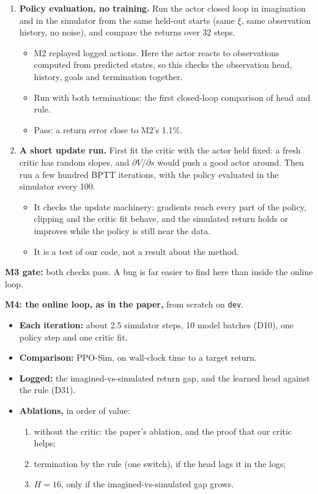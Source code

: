 \documentclass[10pt]{article}
\begin{document}
\begin{enumerate}
  \item \textbf{Policy evaluation, no training.} Run the actor closed loop in imagination and in the
  simulator from the same held-out starts (same $\xi$, same observation history, no noise), and compare
  the returns over 32 steps.
  \begin{itemize}
    \item M2 replayed logged actions. Here the actor reacts to observations computed from predicted
    states, so this checks the observation head, history, goals and termination together.
    \item Run with both terminations: the first closed-loop comparison of head and rule.
    \item Pass: a return error close to M2's 1.1\%.
  \end{itemize}
  \item \textbf{A short update run.} First fit the critic with the actor held fixed: a fresh critic
  has random slopes, and $\partial V/\partial s$ would push a good actor around. Then run a few hundred
  BPTT iterations, with the policy evaluated in the simulator every 100.
  \begin{itemize}
    \item It checks the update machinery: gradients reach every part of the policy, clipping and the
    critic fit behave, and the simulated return holds or improves while the policy is still near the
    data.
    \item It is a test of our code, not a result about the method.
  \end{itemize}
\end{enumerate}
\textbf{M3 gate:} both checks pass. A bug is far easier to find here than inside the online loop.

\textbf{M4: the online loop, as in the paper,} from scratch on \texttt{dev}.
\begin{itemize}
  \item \textbf{Each iteration:} about 2.5 simulator steps, 10 model batches (D10), one policy step and
  one critic fit.
  \item \textbf{Comparison:} PPO-Sim, on wall-clock time to a target return.
  \item \textbf{Logged:} the imagined-vs-simulated return gap, and the learned head against the rule
  (D31).
  \item \textbf{Ablations,} in order of value:
  \begin{enumerate}
    \item without the critic: the paper's ablation, and the proof that our critic helps;
    \item termination by the rule (one switch), if the head lags it in the logs;
    \item $H = 16$, only if the imagined-vs-simulated gap grows.
  \end{enumerate}
\end{itemize}
\end{document}
